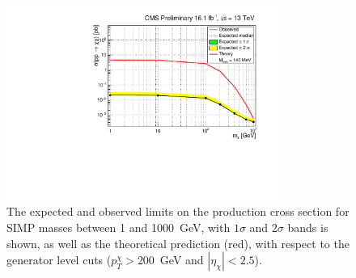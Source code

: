 \begin{figure}[h]
  \centering
  \includegraphics[width=0.8\textwidth]{figures/SIMP_limit_ChF0p05_unblinded.pdf}\hfill%
  \caption{The expected and observed limits on the production cross section for SIMP masses between 1 and 1000~GeV, with $1\sigma$ and $2\sigma$ bands is shown, as well as the theoretical prediction (red), with respect to the generator level cuts ($p_T^{\chi} > 200$~GeV and $|\eta_{\chi}| < 2.5$).}
  \label{fig:SIMP_limit_unblinded}
\end{figure}

\clearpage


\clearpage{\pagestyle{empty}\cleardoublepage}
